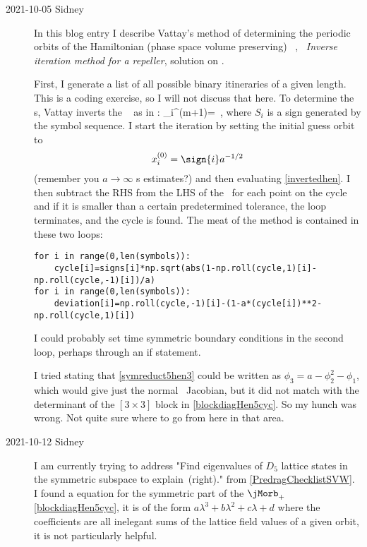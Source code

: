 \begin{description}
\item[2021-10-05 Sidney]
In this blog entry I describe Vattay's method of determining the
periodic orbits of the Hamiltonian (phase space volume preserving)
\henlatt\ , ~{\em Inverse iteration
method for a {\Henon} repeller}, solution on .

First, I generate a list of all possible binary itineraries of a given
length. This is a coding exercise, so I will not discuss that here. To
determine the \po s, Vattay inverts the \henlatt\   as in
:
\beq
\ssp_{i}^{(m+1)}=
\,,
where $S_i$ is a sign generated by the symbol sequence. I start the
iteration by setting the initial guess orbit to
$$\ssp_{i}^{(0)}= \sign{i}a^{-1/2}$$
(remember you $a\to\infty$ {\lattstate}s estimates?)
and then evaluating \eqref{invertedhen}.
I then subtract the RHS from the LHS of the
\henlatt\ for each point on the cycle and if it is smaller than a certain
predetermined tolerance, the loop terminates, and the cycle is found. The
meat of the method is contained in these two loops:
{\footnotesize
\begin{verbatim}
for i in range(0,len(symbols)):
	cycle[i]=signs[i]*np.sqrt(abs(1-np.roll(cycle,1)[i]-np.roll(cycle,-1)[i])/a)
for i in range(0,len(symbols)):
	deviation[i]=np.roll(cycle,-1)[i]-(1-a*(cycle[i])**2-np.roll(cycle,1)[i])
\end{verbatim}
}
I could probably set time symmetric boundary conditions in the second
loop, perhaps through an if statement.

I tried stating that \eqref{symreduct5hen3} could be written as
$\phi_{3}=a-\phi_2^2-\phi_1$, which would give just the normal \henlatt\
Jacobian, but it did not match with the determinant of  the $[3\times3]$
block in \eqref{blockdiagHen5cyc}. So my hunch was wrong. Not quite sure
where to go from here in that area.

\item[2021-10-12 Sidney]
I am currently trying to address "Find eigenvalues of $D_5$ lattice
states in the symmetric subspace to explain
\,(right)." from \ref{PredragChecklistSVW}. I found
a equation for the symmetric part of the {\jacobianOrb} $\jMorb_+$
\eqref{blockdiagHen5cyc}, it is of the form
$a\lambda^3+b\lambda^2+c\lambda+d$ where the coefficients are all
inelegant sums of the lattice field values of a given orbit, it is not
particularly helpful.


\end{description}
